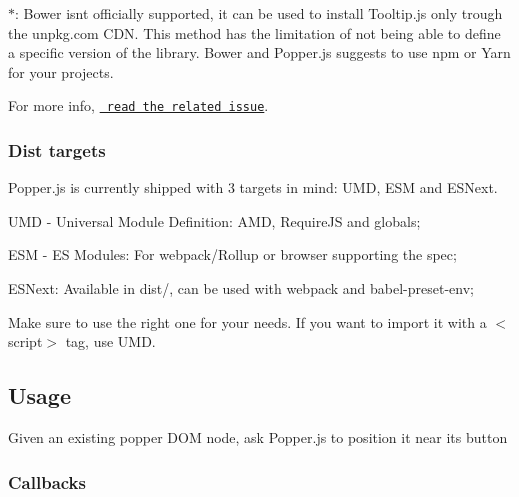 $\ast$\+: Bower isn\textquotesingle{}t officially supported, it can be used to install Tooltip.\+js only trough the unpkg.\+com C\+DN. This method has the limitation of not being able to define a specific version of the library. Bower and Popper.\+js suggests to use npm or Yarn for your projects.

For more info, \href{https://github.com/FezVrasta/popper.js/issues/390}{\texttt{ read the related issue}}.

\subsubsection*{Dist targets}

Popper.\+js is currently shipped with 3 targets in mind\+: U\+MD, E\+SM and E\+S\+Next.


\begin{DoxyItemize}
\item U\+MD -\/ Universal Module Definition\+: A\+MD, Require\+JS and globals;
\item E\+SM -\/ ES Modules\+: For webpack/\+Rollup or browser supporting the spec;
\item E\+S\+Next\+: Available in {\ttfamily dist/}, can be used with webpack and {\ttfamily babel-\/preset-\/env};
\end{DoxyItemize}

Make sure to use the right one for your needs. If you want to import it with a {\ttfamily $<$script$>$} tag, use U\+MD.

\subsection*{Usage}

Given an existing popper D\+OM node, ask Popper.\+js to position it near its button


\begin{DoxyCode}{0}
\DoxyCodeLine{    \{}
\DoxyCodeLine{    \}}
\DoxyCodeLine{);}
\end{DoxyCode}


\subsubsection*{Callbacks}

